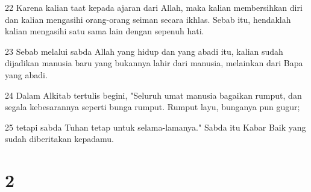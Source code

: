 \par 22 Karena kalian taat kepada ajaran dari Allah, maka kalian membersihkan diri dan kalian mengasihi orang-orang seiman secara ikhlas. Sebab itu, hendaklah kalian mengasihi satu sama lain dengan sepenuh hati.
\par 23 Sebab melalui sabda Allah yang hidup dan yang abadi itu, kalian sudah dijadikan manusia baru yang bukannya lahir dari manusia, melainkan dari Bapa yang abadi.
\par 24 Dalam Alkitab tertulis begini, "Seluruh umat manusia bagaikan rumput, dan segala kebesarannya seperti bunga rumput. Rumput layu, bunganya pun gugur;
\par 25 tetapi sabda Tuhan tetap untuk selama-lamanya." Sabda itu Kabar Baik yang sudah diberitakan kepadamu.

\chapter{2}

